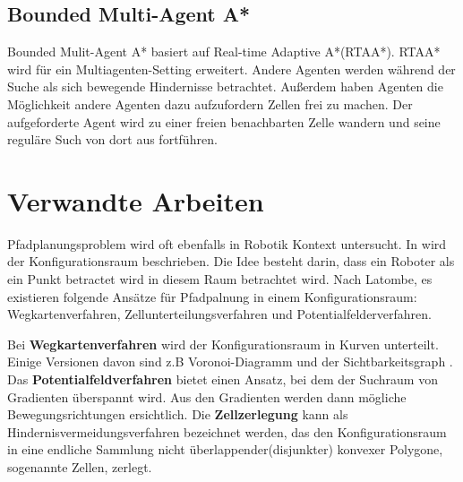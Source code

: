 \subsection{Bounded Multi-Agent A*}
Bounded Mulit-Agent A* basiert auf Real-time Adaptive A*(RTAA*). RTAA* wird für ein Multiagenten-Setting erweitert. Andere Agenten werden während der Suche als sich bewegende Hindernisse betrachtet. Außerdem haben Agenten die Möglichkeit andere Agenten dazu aufzufordern Zellen frei zu machen. Der aufgeforderte Agent wird zu einer freien benachbarten Zelle wandern und seine reguläre Such von dort aus fortführen\cite{Sigurdson.2019}.

\section{Verwandte Arbeiten}

\begin{sloppypar}
Pfadplanungsproblem wird oft ebenfalls in Robotik Kontext untersucht. In \cite{LP80} wird der Konfigurationsraum beschrieben. Die Idee besteht darin, dass ein Roboter als ein Punkt betractet wird in diesem Raum betrachtet wird. Nach Latombe\cite{latombe}, %
es existieren folgende Ansätze für Pfadpalnung in einem Konfigurationsraum: Wegkartenverfahren, Zellunterteilungsverfahren und Potentialfelderverfahren.


Bei \textbf{Wegkartenverfahren} wird der Konfigurationsraum in Kurven unterteilt. Einige Versionen davon sind z.B Voronoi-Diagramm \cite{voronoi} %
und der Sichtbarkeitsgraph \cite{LPAW79}. Das \textbf{Potentialfeldverfahren} bietet einen Ansatz, bei dem der Suchraum von Gradienten überspannt wird. Aus den Gradienten werden dann mögliche Bewegungsrichtungen ersichtlich. Die \textbf{Zellzerlegung} \cite{Cai09} kann als Hindernisvermeidungsverfahren bezeichnet werden, das den Konfigurationsraum in eine endliche Sammlung nicht überlappender(disjunkter) konvexer Polygone, sogenannte Zellen, zerlegt.
\end{sloppypar}
